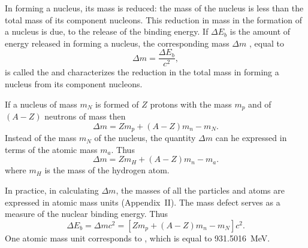 In forming a nucleus, its mass is reduced: the mass of the
nucleus is less than the total mass of its component nucleons. This reduction in mass in the formation of a nucleus is due, to the release of the binding energy. If $\Delta E_{b}$ is the amount of energy released in forming a nucleus, the corresponding mass $\Delta m$ , equal to 
\begin{equation*}%
\Delta m = \frac{\Delta E_{b}}{c^{2}},
\end{equation*}
is called the  and characterizes the reduction in the total mass in forming a nucleus from its component nucleons. 

If a nucleus of mass $m_{N}$ is formed of $Z$ protons with the mass $m_{p}$ and of $(A - Z)$ neutrons of mass then
\begin{equation*}%
\Delta m = Z m_{p} + (A- Z) m_{n} - m_{N}.
\end{equation*}
Instead of the mass $m_{N}$ of the nucleus, the quantity $\Delta m$ can he expressed in terms of the atomic mass $m_{a}$. Thus
\begin{equation*}%
\Delta m = Z m_{H} + (A- Z) m_{n} - m_{a}.
\end{equation*}
where $m_{H}$ is the mass of the hydrogen atom.

In practice, in calculating $\Delta m$, the masses of all the particles and atoms are expressed in atomic mass units (Appendix~II). The mass defect serves as a measure of the nuclear binding energy. Thus
\begin{equation*}%
\Delta E_{b} = \Delta mc^{2} = [Z m_{p} + (A - Z)m_{n} - m_{N}]c^{2}.
\end{equation*}
One atomic mass unit corresponds to , which is equal to \SI{931.5016}{\mega\electronvolt}.


